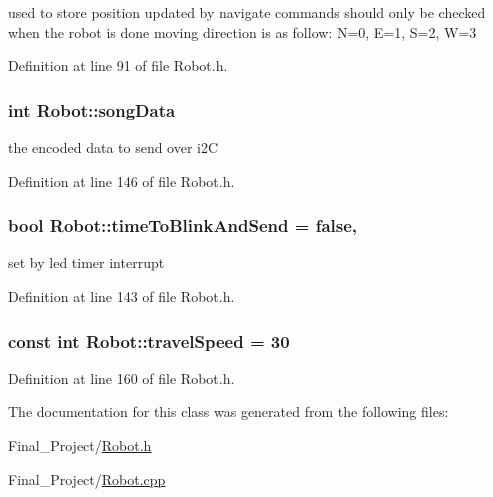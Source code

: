 used to store position updated by navigate commands should only be checked when the robot is done moving direction is as follow\-: N=0, E=1, S=2, W=3 



Definition at line 91 of file Robot.\-h.

\hypertarget{classRobot_a7818916adfa736ab4cb21011fe302cdb}{
\subsubsection[{song\-Data}]{\setlength{\rightskip}{0pt plus 5cm}int Robot\-::song\-Data\hspace{0.3cm}{\ttfamily [private]}}}\label{classRobot_a7818916adfa736ab4cb21011fe302cdb}


the encoded data to send over i2\-C 



Definition at line 146 of file Robot.\-h.

\hypertarget{classRobot_aa074884ad594acf20282805c811adaff}{
\subsubsection[{time\-To\-Blink\-And\-Send}]{\setlength{\rightskip}{0pt plus 5cm}bool Robot\-::time\-To\-Blink\-And\-Send = false\hspace{0.3cm}{\ttfamily [static]}, {\ttfamily [private]}}}\label{classRobot_aa074884ad594acf20282805c811adaff}


set by led timer interrupt 



Definition at line 143 of file Robot.\-h.

\hypertarget{classRobot_a87ec942d7d53b1a4b1c46422f6a134eb}{
\subsubsection[{travel\-Speed}]{\setlength{\rightskip}{0pt plus 5cm}const int Robot\-::travel\-Speed = 30\hspace{0.3cm}{\ttfamily [private]}}}\label{classRobot_a87ec942d7d53b1a4b1c46422f6a134eb}


Definition at line 160 of file Robot.\-h.



The documentation for this class was generated from the following files\-:\begin{DoxyCompactItemize}
\item 
Final\-\_\-\-Project/\hyperlink{Robot_8h}{Robot.\-h}\item 
Final\-\_\-\-Project/\hyperlink{Robot_8cpp}{Robot.\-cpp}\end{DoxyCompactItemize}
